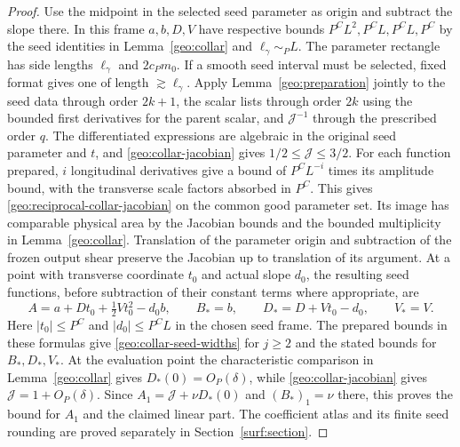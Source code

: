 \documentclass[11pt]{amsart}
\theoremstyle{definition}
\theoremstyle{remark}
\numberwithin{equation}{section}
\begin{document}
\begin{proof}
Use the midpoint in the selected seed parameter as origin and subtract the slope there. In this frame $a,b,D,V$ have respective bounds $P^CL^2,P^CL,P^CL,P^C$ by the seed identities in Lemma~\ref{geo:collar} and $\ell_\gamma\sim_P L$. The parameter rectangle has side lengths $\ell_\gamma$ and $2c_Pm_0$. If a smooth seed interval must be selected, fixed format gives one of length $\gtrsim\ell_\gamma$. Apply Lemma~\ref{geo:preparation} jointly to the seed data through order $2k+1$, the scalar lists through order $2k$ using the bounded first derivatives for the parent scalar, and $\mathcal J^{-1}$ through the prescribed order $q$. The differentiated expressions are algebraic in the original seed parameter and $t$, and \eqref{geo:collar-jacobian} gives $1/2\le\mathcal J\le3/2$. For each function prepared, $i$ longitudinal derivatives give a bound of $P^CL^{-i}$ times its amplitude bound, with the transverse scale factors absorbed in $P^C$. This gives \eqref{geo:reciprocal-collar-jacobian} on the common good parameter set. Its image has comparable physical area by the Jacobian bounds and the bounded multiplicity in Lemma~\ref{geo:collar}. Translation of the parameter origin and subtraction of the frozen output shear preserve the Jacobian up to translation of its argument. At a point with transverse coordinate $t_0$ and actual slope $d_0$, the resulting seed functions, before subtraction of their constant terms where appropriate, are
\[
A=a+Dt_0+\tfrac12Vt_0^2-d_0b,\qquad B_*=b,\qquad D_*=D+Vt_0-d_0,\qquad V_*=V.
\]
Here $|t_0|\le P^C$ and $|d_0|\le P^CL$ in the chosen seed frame. The prepared bounds in these formulas give \eqref{geo:collar-seed-widths} for $j\ge2$ and the stated bounds for $B_*,D_*,V_*$. At the evaluation point the characteristic comparison in Lemma~\ref{geo:collar} gives $D_*(0)=O_P(\delta)$, while \eqref{geo:collar-jacobian} gives $\mathcal J=1+O_P(\delta)$. Since $A_1=\mathcal J+\nu D_*(0)$ and $(B_*)_1=\nu$ there, this proves the bound for $A_1$ and the claimed linear part. The coefficient atlas and its finite seed rounding are proved separately in Section~\ref{surf:section}.
\end{proof}
\end{document}
